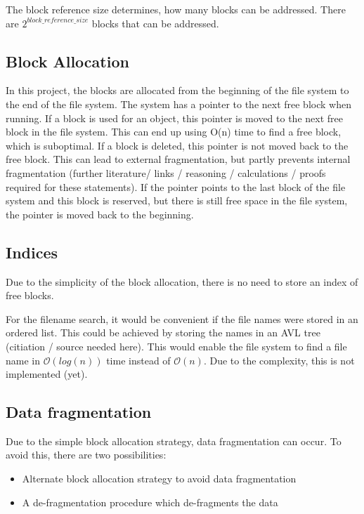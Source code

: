 \noindent The block reference size determines, how many blocks can be addressed. There are $2^{block\_reference\_size}$ blocks that can be addressed.

\subsection{Block Allocation}

In this project, the blocks are allocated from the beginning of the file system to the end of the file system. The system has a pointer to the next free block when running. If a block is used for an object, this pointer is moved to the next free block in the file system. This can end up using O(n) time to find a free block, which is suboptimal. If a block is deleted, this pointer is not moved back to the free block. This can lead to external fragmentation, but partly prevents internal fragmentation (further literature/ links / reasoning / calculations / proofs required for these statements). If the pointer points to the last block of the file system and this block is reserved, but there is still free space in the file system, the pointer is moved back to the beginning.

\subsection{Indices}

Due to the simplicity of the block allocation, there is no need to store an index of free blocks.

For the filename search, it would be convenient if the file names were stored in an ordered list. This could be achieved by storing the names in an AVL tree (citiation / source needed here). This would enable the file system to
find a file name in $\mathcal{O}(log(n))$ time instead of $\mathcal{O}(n)$. Due to the complexity, this is not implemented (yet).

\subsection{Data fragmentation}

Due to the simple block allocation strategy, data fragmentation can occur. To avoid this, there are two possibilities:

\begin{itemize}
  \item Alternate block allocation strategy to avoid data fragmentation
  \item A de-fragmentation procedure which de-fragments the data
\end{itemize}

